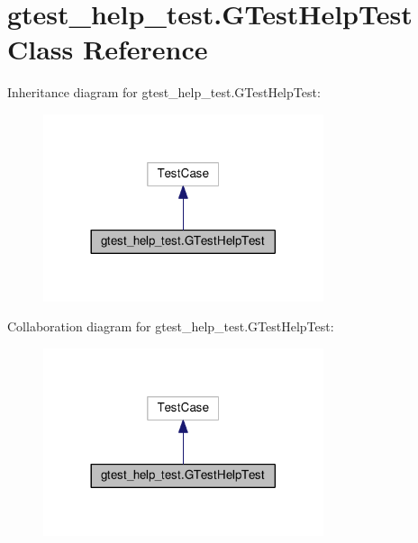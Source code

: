 \hypertarget{classgtest__help__test_1_1GTestHelpTest}{}\section{gtest\+\_\+help\+\_\+test.\+G\+Test\+Help\+Test Class Reference}
\label{classgtest__help__test_1_1GTestHelpTest}


Inheritance diagram for gtest\+\_\+help\+\_\+test.\+G\+Test\+Help\+Test\+:\nopagebreak
\begin{figure}[H]
\begin{center}
\leavevmode
\includegraphics[width=233pt]{classgtest__help__test_1_1GTestHelpTest__inherit__graph}
\end{center}
\end{figure}


Collaboration diagram for gtest\+\_\+help\+\_\+test.\+G\+Test\+Help\+Test\+:\nopagebreak
\begin{figure}[H]
\begin{center}
\leavevmode
\includegraphics[width=233pt]{classgtest__help__test_1_1GTestHelpTest__coll__graph}
\end{center}
\end{figure}
